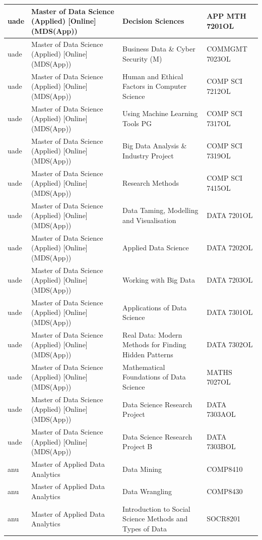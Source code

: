 \documentclass[
  letterpaper,
  DIV=11,
  numbers=noendperiod]{scrreport}
\begin{document}
\begin{table}
\begin{tabular}{l|l|l|l}
\hline
uade & Master of Data Science (Applied) [Online] (MDS(App)) & Decision Sciences & APP MTH 7201OL\\
\hline
uade & Master of Data Science (Applied) [Online] (MDS(App)) & Business Data \& Cyber Security (M) & COMMGMT 7023OL\\
\hline
uade & Master of Data Science (Applied) [Online] (MDS(App)) & Human and Ethical Factors in Computer Science & COMP SCI 7212OL\\
\hline
uade & Master of Data Science (Applied) [Online] (MDS(App)) & Using Machine Learning Tools PG & COMP SCI 7317OL\\
\hline
uade & Master of Data Science (Applied) [Online] (MDS(App)) & Big Data Analysis \& Industry Project & COMP SCI 7319OL\\
\hline
uade & Master of Data Science (Applied) [Online] (MDS(App)) & Research Methods & COMP SCI 7415OL\\
\hline
uade & Master of Data Science (Applied) [Online] (MDS(App)) & Data Taming, Modelling and Visualisation & DATA 7201OL\\
\hline
uade & Master of Data Science (Applied) [Online] (MDS(App)) & Applied Data Science & DATA 7202OL\\
\hline
uade & Master of Data Science (Applied) [Online] (MDS(App)) & Working with Big Data & DATA 7203OL\\
\hline
uade & Master of Data Science (Applied) [Online] (MDS(App)) & Applications of Data Science & DATA 7301OL\\
\hline
uade & Master of Data Science (Applied) [Online] (MDS(App)) & Real Data: Modern Methods for Finding Hidden Patterns & DATA 7302OL\\
\hline
uade & Master of Data Science (Applied) [Online] (MDS(App)) & Mathematical Foundations of Data Science & MATHS 7027OL\\
\hline
uade & Master of Data Science (Applied) [Online] (MDS(App)) & Data Science Research Project & DATA 7303AOL\\
\hline
uade & Master of Data Science (Applied) [Online] (MDS(App)) & Data Science Research Project B & DATA 7303BOL\\
\hline
anu & Master of Applied Data Analytics & Data Mining & COMP8410\\
\hline
anu & Master of Applied Data Analytics & Data Wrangling & COMP8430\\
\hline
anu & Master of Applied Data Analytics & Introduction to Social Science Methods and Types of Data & SOCR8201\\

\end{tabular}
\end{table}
\end{document}
